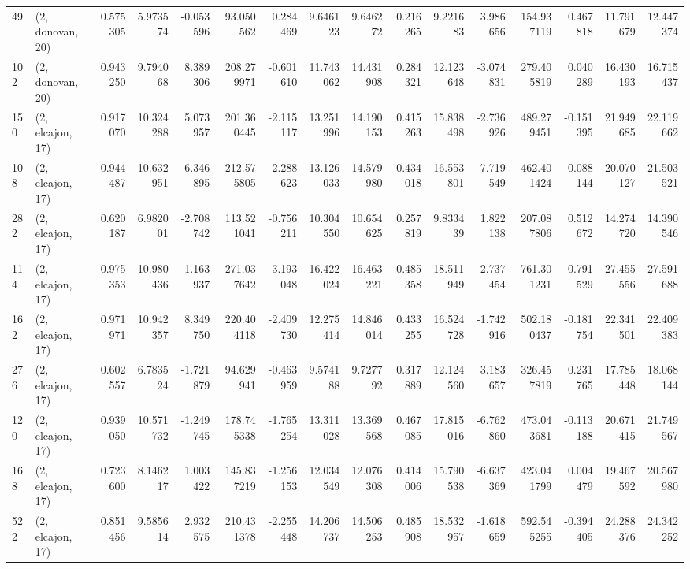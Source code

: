 \begin{tabular}{llrrrrrrrrrrrrrr}
49  &  (2, donovan, 20) &   0.575305 &   5.973574 &  -0.053596 &    93.050562 &   0.284469 &   9.646123 &   9.646272 &  0.216265 &   9.221683 &   3.986656 &    154.937119 &   0.467818 &   11.791679 &   12.447374 \\
102 &  (2, donovan, 20) &   0.943250 &   9.794068 &   8.389306 &   208.279971 &  -0.601610 &  11.743062 &  14.431908 &  0.284321 &  12.123648 &  -3.074831 &    279.405819 &   0.040289 &   16.430193 &   16.715437 \\
150 &  (2, elcajon, 17) &   0.917070 &  10.324288 &   5.073957 &   201.360445 &  -2.115117 &  13.251996 &  14.190153 &  0.415263 &  15.838498 &  -2.736926 &    489.279451 &  -0.151395 &   21.949685 &   22.119662 \\
108 &  (2, elcajon, 17) &   0.944487 &  10.632951 &   6.346895 &   212.575805 &  -2.288623 &  13.126033 &  14.579980 &  0.434018 &  16.553801 &  -7.719549 &    462.401424 &  -0.088144 &   20.070127 &   21.503521 \\
282 &  (2, elcajon, 17) &   0.620187 &   6.982001 &  -2.708742 &   113.521041 &  -0.756211 &  10.304550 &  10.654625 &  0.257819 &   9.833439 &   1.822138 &    207.087806 &   0.512672 &   14.274720 &   14.390546 \\
114 &  (2, elcajon, 17) &   0.975353 &  10.980436 &   1.163937 &   271.037642 &  -3.193048 &  16.422024 &  16.463221 &  0.485358 &  18.511949 &  -2.737454 &    761.301231 &  -0.791529 &   27.455556 &   27.591688 \\
162 &  (2, elcajon, 17) &   0.971971 &  10.942357 &   8.349750 &   220.404118 &  -2.409730 &  12.275414 &  14.846014 &  0.433255 &  16.524728 &  -1.742916 &    502.180437 &  -0.181754 &   22.341501 &   22.409383 \\
276 &  (2, elcajon, 17) &   0.602557 &   6.783524 &  -1.721879 &    94.629941 &  -0.463959 &   9.574188 &   9.727792 &  0.317889 &  12.124560 &   3.183657 &    326.457819 &   0.231765 &   17.785448 &   18.068144 \\
120 &  (2, elcajon, 17) &   0.939050 &  10.571732 &  -1.249745 &   178.745338 &  -1.765254 &  13.311028 &  13.369568 &  0.467085 &  17.815016 &  -6.762860 &    473.043681 &  -0.113188 &   20.671415 &   21.749567 \\
168 &  (2, elcajon, 17) &   0.723600 &   8.146217 &   1.003422 &   145.837219 &  -1.256153 &  12.034549 &  12.076308 &  0.414006 &  15.790538 &  -6.637369 &    423.041799 &   0.004479 &   19.467592 &   20.567980 \\
522 &  (2, elcajon, 17) &   0.851456 &   9.585614 &   2.932575 &   210.431378 &  -2.255448 &  14.206737 &  14.506253 &  0.485908 &  18.532957 &  -1.618659 &    592.545255 &  -0.394405 &   24.288376 &   24.342252 \\

\end{tabular}
